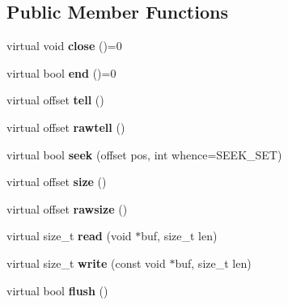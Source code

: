 \subsection*{Public Member Functions}
\begin{DoxyCompactItemize}
\item 
\mbox{\label{structstream_a7d1d5df9653558cd98ef59bd0ff17c82}} 
virtual void {\bfseries close} ()=0
\item 
\mbox{\label{structstream_af55605f68f3d1990f7b33d17b0967937}} 
virtual bool {\bfseries end} ()=0
\item 
\mbox{\label{structstream_a513344035d86eecb5ea0c79569066b27}} 
virtual offset {\bfseries tell} ()
\item 
\mbox{\label{structstream_ae3741db3344f31d3b9e9d2251a697d3c}} 
virtual offset {\bfseries rawtell} ()
\item 
\mbox{\label{structstream_abf4750ed1c7263e9059332d0751e2009}} 
virtual bool {\bfseries seek} (offset pos, int whence=S\+E\+E\+K\+\_\+\+S\+ET)
\item 
\mbox{\label{structstream_ac701c107b4671eb9855492d44886f249}} 
virtual offset {\bfseries size} ()
\item 
\mbox{\label{structstream_a7648d7c347c72d7dc41fe3312e36825f}} 
virtual offset {\bfseries rawsize} ()
\item 
\mbox{\label{structstream_adcd2510b35b11b7f78dd75207bf43d48}} 
virtual size\+\_\+t {\bfseries read} (void $\ast$buf, size\+\_\+t len)
\item 
\mbox{\label{structstream_adca468bcd576f0fc896df0fa43ab377f}} 
virtual size\+\_\+t {\bfseries write} (const void $\ast$buf, size\+\_\+t len)
\item 
\mbox{\label{structstream_a9d50f49eeb2b0a15b7c3f91e3d15eef3}} 
virtual bool {\bfseries flush} ()
\item 
\mbox{\label{structstream_a603db65c392bfe44f108a0d7cefdff98}} 

\end{DoxyCompactItemize}
